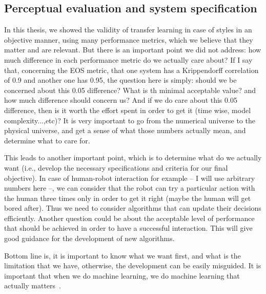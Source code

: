   \subsection{Perceptual evaluation and system specification}
    \par In this thesis, we showed the validity of transfer learning in case of styles in an objective manner, using many performance metrics, which we believe that they matter and are relevant. But there is an important point we did not address: how much difference in each performance metric do we actually care about? If I say that, concerning the EOS metric, that one system has a Krippendorff correlation of 0.9 and another one has 0.95, the question here is simply: should we be concerned about this 0.05 difference? What is th minimal acceptable value? and how much difference should concern us? And if we do care about this 0.05 difference, then is it worth the effort spent in order to get it (time wise, model complexity...,etc)? It is very important to go from the numerical universe to the physical universe, and get a sense of what those numbers actually mean, and determine what to care for.

    \par This leads to another important point, which is to determine what do we actually want (i.e., develop the necessary specifications and criteria for our final objective). In case of human-robot interaction for example -- I will use arbitrary numbers here --, we can consider that the robot can try a particular action with the human three times only in order to get it right (maybe the human will get bored after). Thus we need to consider algorithms that can update their decisions efficiently. Another question could be about the acceptable level of performance that should be achieved in order to have a successful interaction. This will give good guidance for the development of new algorithms.

    \par Bottom line is, it is important to know what we want first, and what is the limitation that we have, otherwise, the development can be easily misguided. It is important that when we do machine learning, we do machine learning that actually matters~\citep{wagstaff2012machine}.

